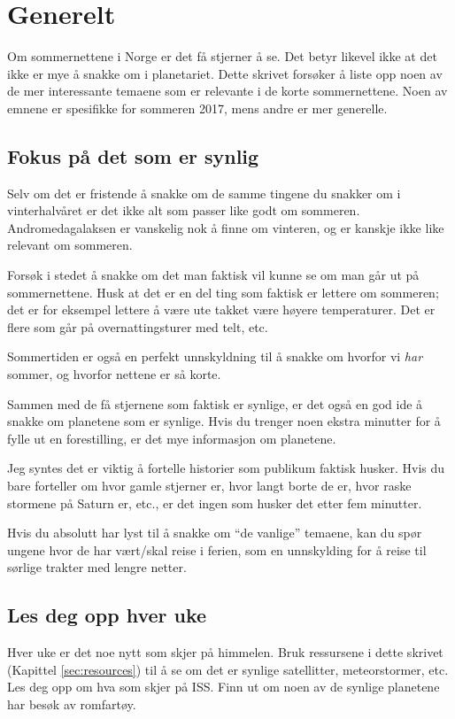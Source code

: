 \documentclass[../SommerstjernerA4.tex]{subfiles}
\begin{document}
\section{Generelt}
Om sommernettene i Norge er det få stjerner å se. Det betyr likevel ikke at det ikke er mye å snakke om i planetariet. Dette skrivet forsøker å liste opp noen av de mer interessante temaene som er relevante i de korte sommernettene. Noen av emnene er spesifikke for sommeren 2017, mens andre er mer generelle.

\subsection{Fokus på det som er synlig}
Selv om det er fristende å snakke om de samme tingene du snakker om i vinterhalvåret er det ikke alt som passer like godt om sommeren. Andromedagalaksen er vanskelig nok å finne om vinteren, og er kanskje ikke like relevant om sommeren.

Forsøk i stedet å snakke om det man faktisk vil kunne se om man går ut på sommernettene. Husk at det er en del ting som faktisk er lettere om sommeren; det er for eksempel lettere å være ute takket være høyere temperaturer. Det er flere som går på overnattingsturer med telt, etc.

Sommertiden er også en perfekt unnskyldning til å snakke om hvorfor vi \emph{har} sommer, og hvorfor nettene er så korte.

Sammen med de få stjernene som faktisk er synlige, er det også en god ide å snakke om planetene som er synlige. Hvis du trenger noen ekstra minutter for å fylle ut en forestilling, er det mye informasjon om planetene.

Jeg syntes det er viktig å fortelle historier som publikum faktisk husker. Hvis du bare forteller om hvor gamle stjerner er, hvor langt borte de er, hvor raske stormene på Saturn er, etc., er det ingen som husker det etter fem minutter.

Hvis du absolutt har lyst til å snakke om ``de vanlige'' temaene, kan du spør ungene hvor de har vært/skal reise i ferien, som en unnskylding for å reise til sørlige trakter med lengre netter.

\subsection{Les deg opp hver uke}
Hver uke er det noe nytt som skjer på himmelen. Bruk ressursene i dette skrivet (Kapittel \ref{sec:resources}) til å se om det er synlige satellitter, meteorstormer, etc. Les deg opp om hva som skjer på ISS. Finn ut om noen av de synlige planetene har besøk av romfartøy.
\end{document}
